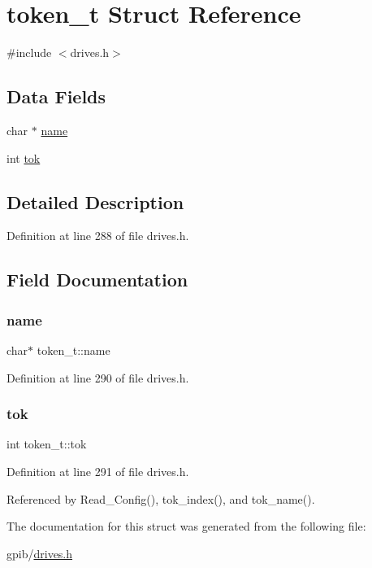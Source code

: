 \hypertarget{structtoken__t}{}\section{token\+\_\+t Struct Reference}
\label{structtoken__t}


{\ttfamily \#include $<$drives.\+h$>$}

\subsection*{Data Fields}
\begin{DoxyCompactItemize}
\item 
char $\ast$ \hyperlink{structtoken__t_a6280ddf4c14a5d6079686deb5f415dfb}{name}
\item 
int \hyperlink{structtoken__t_ab6ff2146ea8b1275e249fd0412988215}{tok}
\end{DoxyCompactItemize}


\subsection{Detailed Description}


Definition at line 288 of file drives.\+h.



\subsection{Field Documentation}
\mbox{\label{structtoken__t_a6280ddf4c14a5d6079686deb5f415dfb}} 
\subsubsection{\texorpdfstring{name}{name}}
{\footnotesize\ttfamily char$\ast$ token\+\_\+t\+::name}



Definition at line 290 of file drives.\+h.

\mbox{\label{structtoken__t_ab6ff2146ea8b1275e249fd0412988215}} 
\subsubsection{\texorpdfstring{tok}{tok}}
{\footnotesize\ttfamily int token\+\_\+t\+::tok}



Definition at line 291 of file drives.\+h.



Referenced by Read\+\_\+\+Config(), tok\+\_\+index(), and tok\+\_\+name().



The documentation for this struct was generated from the following file\+:\begin{DoxyCompactItemize}
\item 
gpib/\hyperlink{drives_8h}{drives.\+h}\end{DoxyCompactItemize}
